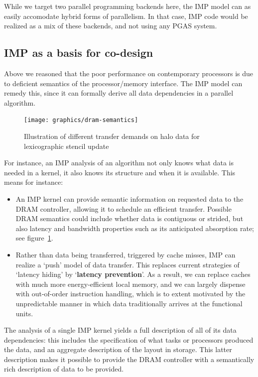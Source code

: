While we target two parallel programming backends here,
the IMP model can as easily accomodate hybrid forms of parallelism.
In that case, IMP code would be realized as a mix of these backends,
and not using any PGAS system.

\subsection{IMP as a basis for co-design}

Above we reasoned that the poor performance on contemporary processors is due to 
deficient semantics of the processor/memory interface.
The \ac{IMP} model can remedy this, since it can formally derive
all data dependencies in a parallel algorithm.

\begin{figure}
  \texttt{[image: graphics/dram-semantics]}
  \caption{Illustration of different transfer demands on halo data
    for lexicographic stencil update}
  \label{fig:dram-halo}
\end{figure}
%
For instance, an \ac{IMP} analysis of an algorithm not only knows
what data is needed in a kernel, it also knows its structure
and when it is available. This means for instance:
\begin{itemize}
\item An \ac{IMP} kernel can provide semantic information on requested
  data to the DRAM controller, allowing it to schedule an efficient
  transfer. Possible DRAM semantics could include whether data is
  contiguous or strided, but also latency and bandwidth properties
  such as its anticipated absorption rate; see
  figure~\ref{fig:dram-halo}.
\item Rather than data being transferred, triggered by cache misses,
  \ac{IMP} can realize a `push' model of data transfer. This replaces
  current strategies of `latency hiding' by `\textbf{latency prevention}'.  As
  a result, we can replace caches with much more energy-efficient
  local memory, and we can largely dispense with out-of-order
  instruction handling, which is to extent motivated by the unpredictable 
  manner in which data traditionally arrives at the functional units.
\end{itemize}

The analysis of a single \ac{IMP} kernel yields a full description 
of all of its data dependencies: this includes the specification of
what tasks or processors produced the data, and an aggregate description
of the layout in storage. This latter description makes it possible 
to provide the DRAM controller with a semantically rich description
of data to be provided.

